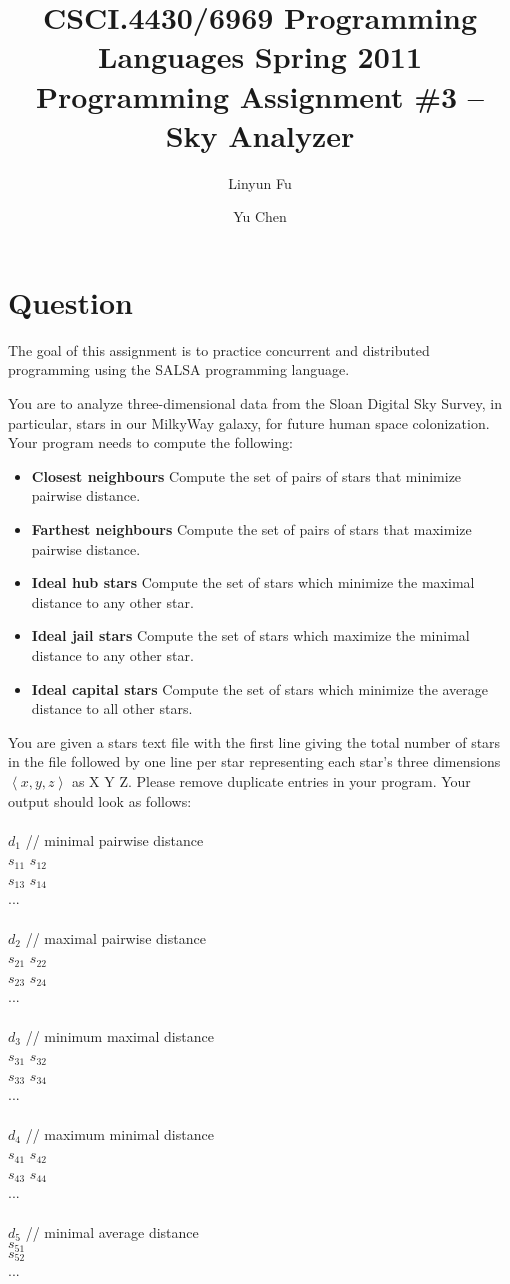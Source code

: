 \documentclass[12pt,letterpaper]{article}
\author{Linyun Fu\and Yu Chen}
\title{CSCI.4430/6969 Programming Languages Spring 2011\\
Programming Assignment \#3 -- Sky Analyzer}
\begin{document}
\maketitle
\part*{Question}
The goal of this assignment is to practice concurrent and distributed programming using the SALSA programming language. 

You are to analyze three-dimensional data from the Sloan Digital Sky Survey, in particular, stars in our MilkyWay galaxy, for future human space colonization. Your program needs to compute the following: 
\begin{itemize}
\item \textbf{Closest neighbours} Compute the set of pairs of stars that minimize pairwise distance.
\item \textbf{Farthest neighbours} Compute the set of pairs of stars that maximize pairwise distance.
\item \textbf{Ideal hub stars} Compute the set of stars which minimize the maximal distance to any other star.
\item \textbf{Ideal jail stars} Compute the set of stars which maximize the minimal distance to any other star.
\item \textbf{Ideal capital stars} Compute the set of stars which minimize the average distance to all other stars. 
\end{itemize}

You are given a stars text file with the first line giving the total number of stars in the file followed by one line per star representing each star's three dimensions $\left<x,y,z\right>$ as X Y Z. Please remove duplicate entries in your program. Your output should look as follows:\\
\\
$d_1$  // minimal pairwise distance\\
$s_{11}$ $s_{12}$\\
$s_{13}$ $s_{14}$\\
...\\
\\
$d_2$  // maximal pairwise distance\\
$s_{21}$ $s_{22}$\\
$s_{23}$ $s_{24}$\\
...\\
\\
$d_3$ // minimum maximal distance\\
$s_{31}$ $s_{32}$\\
$s_{33}$ $s_{34}$\\
...\\
\\
$d_4$ // maximum minimal distance\\
$s_{41}$ $s_{42}$\\
$s_{43}$ $s_{44}$\\
... \\
\\
$d_5$ // minimal average distance\\
$s_{51}$\\
$s_{52}$\\
...\\
\end{document}
